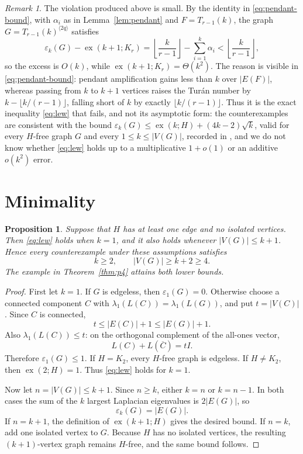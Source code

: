 \documentclass[11pt]{amsart}
\newtheorem{proposition}[theorem]{Proposition}
\theoremstyle{remark}
\newtheorem{remark}[theorem]{Remark}
\newcommand{\eps}{\varepsilon}
\newcommand{\ex}{\operatorname{ex}}
\begin{document}
\begin{remark}\label{rem:size}
The violation produced above is small. By the identity in
\eqref{eq:pendant-bound}, with $\alpha_i$ as in Lemma~\ref{lem:pendant} and
$F=T_{r-1}(k)$, the graph $G=T_{r-1}(k)^{\langle2q\rangle}$ satisfies
\[
\eps_k(G)-\ex(k+1;K_r)
=\left\lfloor\frac{k}{r-1}\right\rfloor-\sum_{i=1}^k\alpha_i
<\left\lfloor\frac{k}{r-1}\right\rfloor,
\]
so the excess is $O(k)$, while $\ex(k+1;K_r)=\Theta(k^2)$. The reason is
visible in \eqref{eq:pendant-bound}: pendant amplification gains less than $k$
over $|E(F)|$, whereas passing from $k$ to $k+1$ vertices raises the Tur\'an
number by $k-\lfloor k/(r-1)\rfloor$, falling short of $k$ by exactly
$\lfloor k/(r-1)\rfloor$. Thus it is the exact inequality \eqref{eq:lew} that
fails, and not its asymptotic form: the counterexamples are consistent with the
bound $\eps_k(G)\le\ex(k;H)+(4k-2)\sqrt k$, valid for every $H$-free graph $G$
and every $1\le k\le|V(G)|$, recorded in \cite[Section~7]{Lew}, and we
do not know whether \eqref{eq:lew} holds up to a multiplicative $1+o(1)$ or an
additive $o(k^2)$ error.
\end{remark}

\section{Minimality}

\begin{proposition}\label{prop:minimality}
Suppose that $H$ has at least one edge and no isolated vertices. Then
\eqref{eq:lew} holds when $k=1$, and it also holds whenever
$|V(G)|\le k+1$. Hence every counterexample under these assumptions satisfies
\[
k\ge2,
\qquad
|V(G)|\ge k+2\ge4.
\]
The example in Theorem~\ref{thm:p4} attains both lower bounds.
\end{proposition}

\begin{proof}
First let $k=1$. If $G$ is edgeless, then $\eps_1(G)=0$. Otherwise choose a
connected component $C$ with
$\lambda_1(L(C))=\lambda_1(L(G))$, and put $t=|V(C)|$. Since $C$ is
connected,
\[
t\le |E(C)|+1\le |E(G)|+1.
\]
Also $\lambda_1(L(C))\le t$: on the orthogonal complement of the all-ones
vector,
\[
L(C)+L(\overline C)=tI.
\]
Therefore $\eps_1(G)\le1$. If $H=K_2$, every $H$-free graph is edgeless. If
$H\ne K_2$, then $\ex(2;H)=1$. Thus \eqref{eq:lew} holds for $k=1$.

Now let $n=|V(G)|\le k+1$. Since $n\ge k$, either $k=n$ or $k=n-1$.
In both cases the sum of the $k$ largest Laplacian eigenvalues is
$2|E(G)|$, so
\[
\eps_k(G)=|E(G)|.
\]
If $n=k+1$, the definition of $\ex(k+1;H)$ gives the desired bound. If
$n=k$, add one isolated vertex to $G$. Because $H$ has no isolated vertices,
the resulting $(k+1)$-vertex graph remains $H$-free, and the same bound
follows.
\end{proof}
\end{document}

